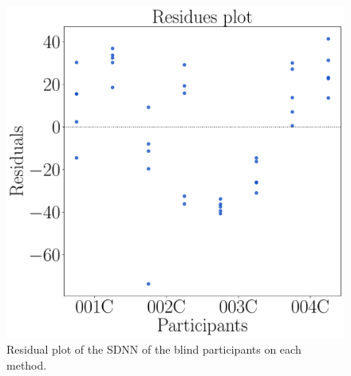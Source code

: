 \begin{figure}[!htb]
\begin{minipage}{0.45\textwidth}
        \includegraphics[width = 0.8\linewidth]{Resultados/ECG/Figuras/pdf/residplot_sdnn_two_way_blind.pdf}
        \caption{Residual plot of the SDNN of the blind participants on each method.}
        \label{fig:residplot_sdnn_two_way_blind}
    \end{minipage}
\end{figure}



\FloatBarrier